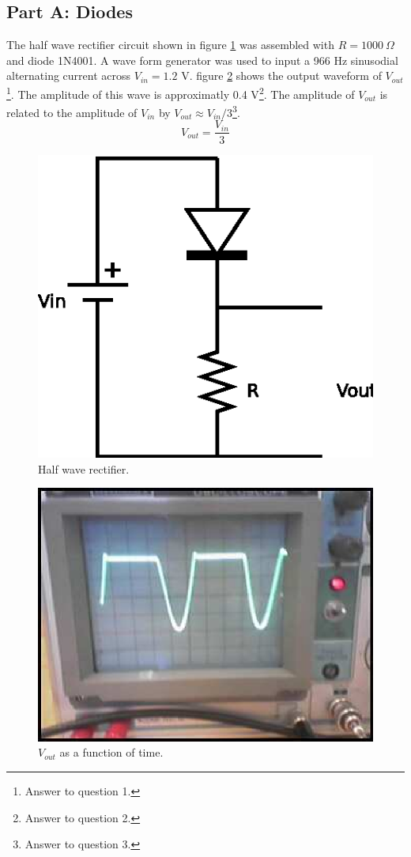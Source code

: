 \documentclass[11pt,onecolumn]{article}
\begin{document}
\subsection{Part A: Diodes}
The half wave rectifier circuit shown in figure \ref{fig:Half_wave_rectifier} was assembled with $R = 1000\ \Omega$ and diode 1N4001. A wave form generator was used to input a 966 Hz sinusodial alternating current across $V_{in} = 1.2$ V. figure \ref{fig:Image1} shows the output waveform of $V_{out}$\footnote{Answer to question 1.}. The amplitude of this wave is approximatly 0.4 V\footnote{Answer to question 2.}. The amplitude of $V_{out}$ is related to the amplitude of $V_{in}$ by $V_{out} \approx V_{in}/3$\footnote{Answer to question 3.}.%
\begin{displaymath}
V_{out} = \frac{V_{in}}{3}
\end{displaymath}
%
%
\begin{figure}
\center
\includegraphics{Diagram1.eps}
\caption{Half wave rectifier.}\label{fig:Half_wave_rectifier}
\end{figure}
%
%
\begin{figure}
\center
\includegraphics{Image1.eps} %
\caption{$V_{out}$ as a function of time.}\label{fig:Image1} %
\end{figure}
\end{document}
